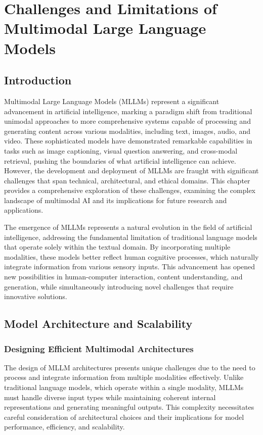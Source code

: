 \chapter{Challenges and Limitations of Multimodal Large Language Models}


\section{Introduction}
Multimodal Large Language Models (MLLMs) represent a significant advancement in artificial intelligence, marking a paradigm shift from traditional unimodal approaches to more comprehensive systems capable of processing and generating content across various modalities, including text, images, audio, and video. These sophisticated models have demonstrated remarkable capabilities in tasks such as image captioning, visual question answering, and cross-modal retrieval, pushing the boundaries of what artificial intelligence can achieve. However, the development and deployment of MLLMs are fraught with significant challenges that span technical, architectural, and ethical domains. This chapter provides a comprehensive exploration of these challenges, examining the complex landscape of multimodal AI and its implications for future research and applications.

The emergence of MLLMs represents a natural evolution in the field of artificial intelligence, addressing the fundamental limitation of traditional language models that operate solely within the textual domain. By incorporating multiple modalities, these models better reflect human cognitive processes, which naturally integrate information from various sensory inputs. This advancement has opened new possibilities in human-computer interaction, content understanding, and generation, while simultaneously introducing novel challenges that require innovative solutions.

\section{Model Architecture and Scalability}

\subsection{Designing Efficient Multimodal Architectures}
The design of MLLM architectures presents unique challenges due to the need to process and integrate information from multiple modalities effectively. Unlike traditional language models, which operate within a single modality, MLLMs must handle diverse input types while maintaining coherent internal representations and generating meaningful outputs. This complexity necessitates careful consideration of architectural choices and their implications for model performance, efficiency, and scalability.

